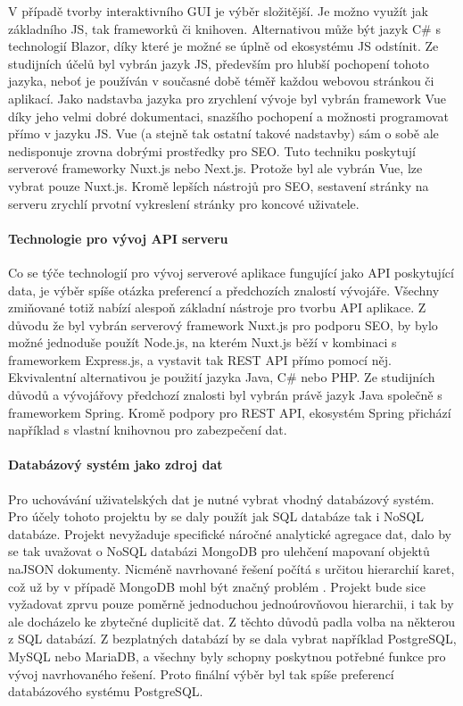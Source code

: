 			V případě tvorby interaktivního \Ac{GUI} je výběr složitější.
			Je možno využít jak základního \ac{JS}, tak frameworků či knihoven.
			Alternativou může být jazyk C\# s technologií Blazor, díky které je možné se úplně od ekosystému
			\ac{JS} odstínit.
			Ze studijních účelů byl vybrán jazyk \ac{JS}, především pro hlubší pochopení tohoto jazyka, neboť je používán v současné
			době téměř každou webovou stránkou či aplikací.
			Jako nadstavba jazyka pro zrychlení vývoje byl vybrán framework Vue díky jeho velmi dobré dokumentaci, snazšího
			pochopení a možnosti programovat přímo v jazyku \ac{JS}.
			Vue (a stejně tak ostatní takové nadstavby) sám o sobě ale nedisponuje zrovna dobrými prostředky pro \Ac{SEO}.
			Tuto techniku poskytují serverové frameworky Nuxt.js nebo Next.js.
			Protože byl ale vybrán Vue, lze vybrat pouze Nuxt.js.
			Kromě lepších nástrojů pro \ac{SEO}, sestavení stránky na serveru zrychlí prvotní vykreslení stránky pro
			koncové uživatele.

			\paragraph{Technologie pro vývoj API serveru}

			Co se týče technologií pro vývoj serverové aplikace fungující jako \ac{API} poskytující data, je výběr spíše
			otázka preferencí a předchozích znalostí vývojáře.
			Všechny zmiňované totiž nabízí alespoň základní nástroje pro tvorbu \ac{API} aplikace.
			Z důvodu že byl vybrán serverový framework Nuxt.js pro podporu \Ac{SEO}, by bylo možné jednoduše použít Node.js,
			na kterém Nuxt.js běží v kombinaci s frameworkem Express.js, a vystavit tak \Ac{REST} \ac{API} přímo pomocí něj.
			Ekvivalentní alternativou je použití jazyka Java, C\# nebo \Ac{PHP}.
			Ze studijních důvodů a vývojářovy předchozí znalosti byl vybrán právě jazyk Java společně s frameworkem
			Spring.
			Kromě podpory pro \ac{REST} \ac{API}, ekosystém Spring přichází například s vlastní knihovnou pro
			zabezpečení dat.

			\paragraph{Databázový systém jako zdroj dat}

			Pro uchovávání uživatelských dat je nutné vybrat vhodný databázový systém.
			Pro účely tohoto projektu by se daly použít jak \ac{SQL} databáze tak i \ac{NoSQL} databáze.
			Projekt nevyžaduje specifické náročné analytické agregace dat, dalo by se tak uvažovat o \ac{NoSQL} databázi
			MongoDB pro ulehčení mapovaní objektů na\ac{JSON} dokumenty.
			Nicméně navrhované řešení počítá s určitou hierarchií karet, což už by v případě MongoDB mohl být značný
			problém \cite{why_you_should_never_use_mongodb}.
			Projekt bude sice vyžadovat zprvu pouze poměrně jednoduchou jednoúrovňovou hierarchii, i tak by ale docházelo ke
			zbytečné duplicitě dat.
			Z těchto důvodů padla volba na některou z \ac{SQL} databází.
			Z bezplatných databází by se dala vybrat například PostgreSQL, MySQL nebo MariaDB, a všechny byly schopny
			poskytnou potřebné funkce pro vývoj navrhovaného řešení.
			Proto finální výběr byl tak spíše preferencí databázového systému PostgreSQL.

